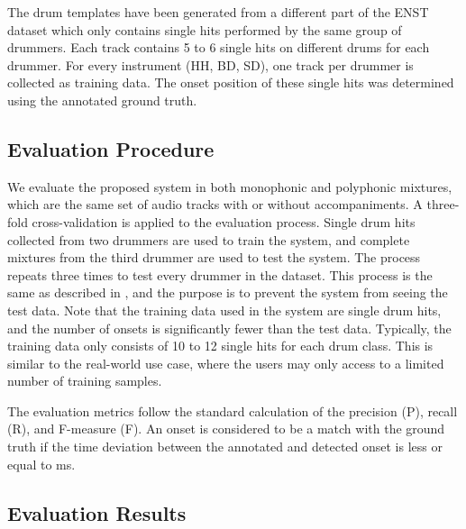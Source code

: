\documentclass{article}
\begin{document}
The drum templates have been generated from a different part of the ENST dataset which only contains single hits performed by the same group of drummers. Each track contains 5 to 6 single hits on different drums for each drummer. For every instrument (HH, BD, SD), one track per drummer is collected as training data. The onset position of these single hits was determined using the annotated ground truth. 

\subsection{Evaluation Procedure}\label{subsec:evaluation procedure}
We evaluate the proposed system in both monophonic and polyphonic mixtures, which are the same set of audio tracks with or without accompaniments. A three-fold cross-validation is applied to the evaluation process. Single drum hits collected from two drummers are used to train the system, and complete mixtures from the third drummer are used to test the system. The process repeats three times to test every drummer in the dataset. This process is the same as described in \cite{Paulus2009a}, and the purpose is to prevent the system from seeing the test data. Note that the training data used in the system are single drum hits, and the number of onsets is significantly fewer than the test data. Typically, the training data only consists of 10 to 12 single hits for each drum class. This is similar to the real-world use case, where the users may only access to a limited number of training samples. 

The evaluation metrics follow the standard calculation of the precision (P), recall (R), and F-measure (F). An onset is considered to be a match with the ground truth if the time deviation between the annotated and detected onset is less or equal to \unit[50]{ms}.  

\subsection{Evaluation Results}\label{subsec:evaluation results}
\end{document}
